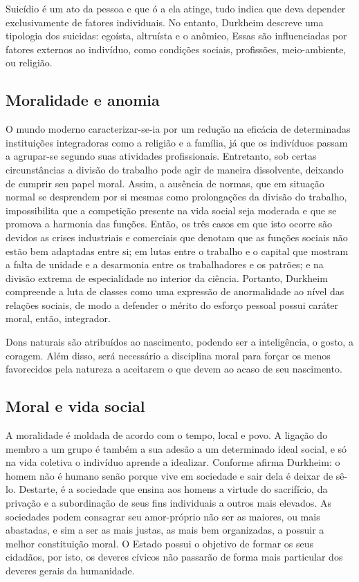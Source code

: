 Suicídio é um ato da pessoa e que ó a ela atinge, tudo indica que deva depender exclusivamente de fatores individuais. No entanto, Durkheim descreve uma tipologia dos suicidas: egoísta, altruísta e o anômico, 
Essas são influenciadas por fatores externos ao indivíduo, como condições sociais, profissões, meio-ambiente,  ou religião.


\subsection{Moralidade e anomia}

O mundo moderno caracterizar-se-ia por um redução na eficácia de determinadas instituições integradoras como a religião e a família, já que os indivíduos passam a agrupar-se segundo suas atividades profissionais. 
Entretanto, sob certas circunstâncias a divisão do trabalho pode agir de maneira dissolvente, deixando de cumprir seu papel moral.
Assim, a ausência de normas, que em situação normal se desprendem por si mesmas como prolongações da divisão do trabalho, impossibilita que a competição presente na vida social seja moderada e que se promova a harmonia das funções.
Então, os três casos em que isto ocorre são devidos as crises industriais e comerciais que denotam que as funções sociais não estão bem adaptadas entre si; em lutas entre o trabalho e o capital que mostram a falta de unidade e a desarmonia entre os trabalhadores e os patrões; e na divisão extrema de especialidade no interior da ciência.
Portanto, Durkheim compreende a luta de classes como uma expressão de anormalidade ao nível das relações sociais, de modo a defender o mérito do esforço pessoal possui caráter moral, então, integrador.

Dons naturais são atribuídos ao nascimento, podendo ser a inteligência, o gosto, a coragem.
Além disso, será necessário a disciplina moral para forçar os menos favorecidos pela natureza a aceitarem o que devem ao acaso de seu nascimento.


\subsection{Moral e vida social}

A moralidade é moldada de acordo com o tempo, local e povo.
A ligação do membro a um grupo é também a sua adesão a um determinado ideal social, e só na vida coletiva o indivíduo aprende a idealizar. 
Conforme afirma Durkheim: o homem não é humano senão porque vive em sociedade e sair dela é deixar de sê-lo. 
Destarte, é a sociedade que ensina aos homens a virtude do sacrifício, da privação e a subordinação de seus fins individuais a outros mais elevados.
As sociedades podem consagrar seu amor-próprio não ser as maiores, ou mais abastadas, e sim a ser as mais justas, as mais bem organizadas, a possuir a melhor constituição moral.
O Estado possui o objetivo de formar os seus cidadãos, por isto, os deveres cívicos não passarão de forma mais particular dos deveres gerais da humanidade.



